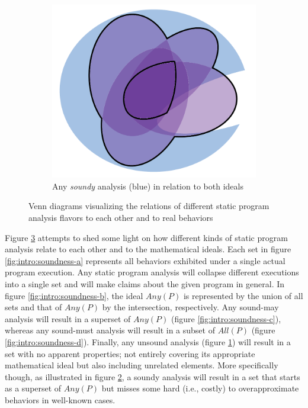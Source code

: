 \begin{figure}[htb!]
\begin{subfigure}{.47\textwidth}
    \label{fig:intro:soundness-e}
\end{subfigure}
\hfill
\begin{subfigure}{.47\textwidth}
    \includegraphics[scale=.45]{assets/introduction/venn-soundness-f.pdf}
    \caption{Any \emph{soundy} analysis (blue) in relation to both ideals}
    \label{fig:intro:soundness-f}
\end{subfigure}
\caption{Venn diagrams visualizing the relations of different static program analysis flavors to each other and to real behaviors}
\label{fig:intro:soundness}
\end{figure}

Figure \ref{fig:intro:soundness} attempts to shed some light on how different kinds of static program analysis relate to each other and to the mathematical ideals. Each set in figure \ref{fig:intro:soundness-a} represents all behaviors exhibited under a single actual program execution. Any static program analysis will collapse different executions into a single set and will make claims about the given program in general. In figure \ref{fig:intro:soundness-b}, the ideal $Any(P)$ is represented by the union of all sets and that of $Any(P)$ by the intersection, respectively. Any sound-may analysis will result in a superset of $Any(P)$ (figure \ref{fig:intro:soundness-c}), whereas any sound-must analysis will result in a subset of $All(P)$ (figure \ref{fig:intro:soundness-d}). Finally, any unsound analysis (figure \ref{fig:intro:soundness-e}) will result in a set with no apparent properties; not entirely covering its appropriate mathematical ideal but also including unrelated elements. More specifically though, as illustrated in figure \ref{fig:intro:soundness-f}, a soundy analysis will result in a set that starts as a superset of $Any(P)$ but misses some hard (i.e., costly) to overapproximate behaviors in well-known cases.


